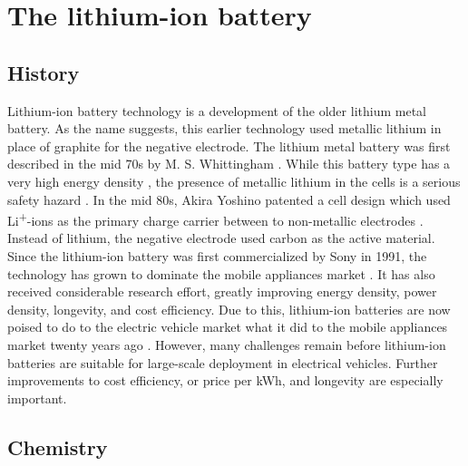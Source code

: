 \documentclass[12pt]{article} %
\begin{document}
\section{The lithium-ion battery} %


\subsection{History} %

Lithium-ion battery technology is a development of the older lithium metal battery.
As the name suggests, this earlier technology used metallic lithium in place of graphite for the negative electrode.
The lithium metal battery was first described in the mid 70s by M. S. Whittingham \cite{whittingham_electrical_1976}.
While this battery type has a very high energy density \cite{van_schalkwijk_chapter_2002}, the presence of metallic lithium in the cells is a serious safety hazard \cite{lisbona_review_2011} \cite{eom_life_2007}.
In the mid 80s, Akira Yoshino patented a cell design which used Li\textsuperscript{+}-ions as the primary charge carrier between to non-metallic electrodes \cite{yoshio_chapter_2009} \cite{yoshino_secondary_1987}.
Instead of lithium, the negative electrode used carbon as the active material.
Since the lithium-ion battery was first commercialized by Sony in 1991, the technology has grown to dominate the mobile appliances market \cite{yoshio_chapter_2009-1}.
It has also received considerable research effort, greatly improving energy density, power density, longevity, and cost efficiency.
Due to this, lithium-ion batteries are now poised to do to the electric vehicle market what it did to the mobile appliances market twenty years ago \cite{reddy_thomas_section_2011}.
However, many challenges remain before lithium-ion batteries are suitable for large-scale deployment in electrical vehicles.
Further improvements to cost efficiency, or price per kWh, and longevity are especially important.


\subsection{Chemistry} %
\end{document}
